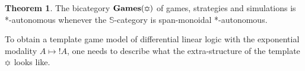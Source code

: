 \documentclass[8pt]{article}
\theoremstyle{definition}
\theoremstyle{definition}
\newtheorem{theorem}{Theorem}[section]
\theoremstyle{definition}
\theoremstyle{definition}
\theoremstyle{definition}
\theoremstyle{definition}
\theoremstyle{definition}
\theoremstyle{definition}
\theoremstyle{definition}
\theoremstyle{definition}
\theoremstyle{definition}
\theoremstyle{definition}
\theoremstyle{definition}
\theoremstyle{definition}
\theoremstyle{question}
\DeclareMathOperator{\bang}{!}
\begin{document}
\begin{theorem}
  The bicategory ${\bf Games}(\davidsstar)$ of games, strategies and simulations is *-autonomous whenever the $\mathbb{S}$-category is span-monoidal
  *-autonomous.
\end{theorem}

\vspace{\baselineskip}

To obtain a template game model of differential linear logic with the exponential modality $A \mapsto \bang A$, one needs to describe what the extra-structure of the template $\davidsstar$ looks like.




\end{document}

